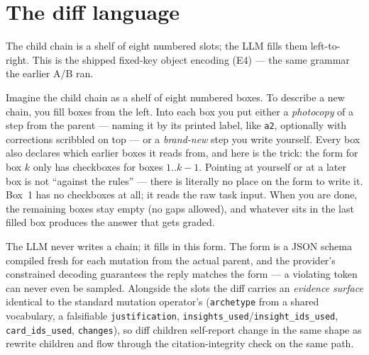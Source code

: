 \documentclass[11pt]{article}
\newenvironment{eli5}
  {\par\medskip\noindent\begin{lrbox}{\eliBox}\begin{minipage}{\dimexpr\linewidth-2\fboxsep-2\fboxrule}\small}
  {\end{minipage}\end{lrbox}\noindent\fcolorbox{accent!40}{accent!4}{\usebox{\eliBox}}\par\medskip}
\begin{document}
\section{The diff language}
\label{sec:language}
The child chain is a shelf of eight numbered slots; the LLM fills them left-to-right. This is
the shipped fixed-key object encoding (E4) --- the same grammar the earlier A/B ran.

\begin{eli5}
Imagine the child chain as a shelf of eight numbered boxes. To describe a new chain, you fill
boxes from the left. Into each box you put either a \emph{photocopy} of a step from the parent
--- naming it by its printed label, like \texttt{a2}, optionally with corrections scribbled on
top --- or a \emph{brand-new} step you write yourself. Every box also declares which earlier
boxes it reads from, and here is the trick: the form for box $k$ only has checkboxes for boxes
$1..k-1$. Pointing at yourself or at a later box is not ``against the rules'' --- there is
literally no place on the form to write it. Box~1 has no checkboxes at all; it reads the raw
task input. When you are done, the remaining boxes stay empty (no gaps allowed), and whatever
sits in the last filled box produces the answer that gets graded.
\end{eli5}
\noindent
The LLM never writes a chain; it fills in this form. The form is a JSON schema compiled fresh
for each mutation from the actual parent, and the provider's constrained decoding guarantees
the reply matches the form --- a violating token can never even be sampled. Alongside the
slots the diff carries an \emph{evidence surface} identical to the standard mutation
operator's (\texttt{archetype} from a shared vocabulary, a falsifiable \texttt{justification},
\texttt{insights\_used}/\texttt{insight\_ids\_used}, \texttt{card\_ids\_used},
\texttt{changes}), so diff children self-report change in the same shape as rewrite children
and flow through the citation-integrity check on the same path.
\end{document}
